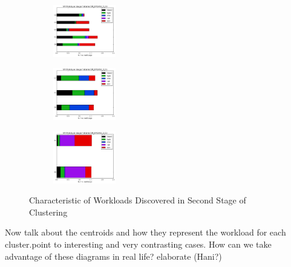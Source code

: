\documentclass[10pt, conference, compsocconf]{IEEEtran}
\begin{document}
\begin{figure}
	\begin{subfigure}
		\centering
		\includegraphics[width=0.3\textwidth]{figs/VM_KMEANS_5_C0_centroids.png}
		\label{fig:c0-centroids}
	\end{subfigure}%
	\begin{subfigure}
		\centering
		\includegraphics[width=0.3\textwidth]{figs/VM_KMEANS_3_C1_centroids.png}
		\label{fig:c1-centroids}
	\end{subfigure}%
	\begin{subfigure}
		\centering
		\includegraphics[width=0.3\textwidth]{figs/VM_KMEANS_2_C2_centroids.png}
		\label{fig:c2-centroids}
	\end{subfigure}%
	\caption{Characteristic of Workloads Discovered in Second Stage of Clustering}
	\label{fig:2nd-centroids}
\end{figure}
Now talk about the centroids and how they represent the workload for each cluster.point to interesting and very contrasting cases. How can we take advantage of these diagrams in real life? elaborate (Hani?)
\end{document}
